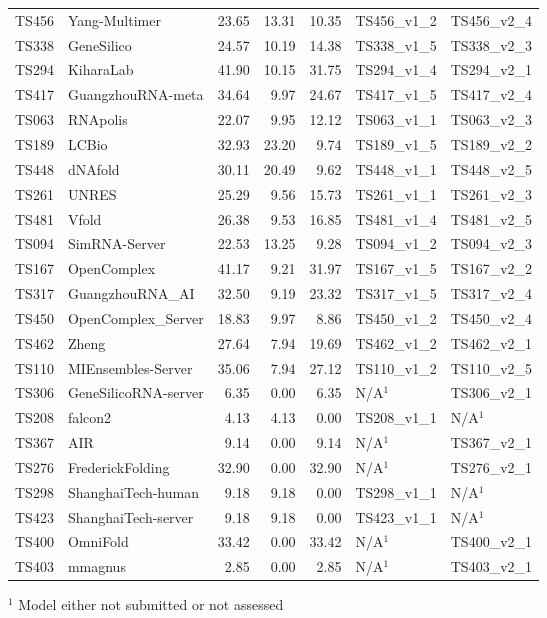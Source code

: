 \begin{table}[ht]
{\begin{tabular}{llrrrll}
TS456 & Yang-Multimer & 23.65 & 13.31 & 10.35 & TS456\_v1\_2 & TS456\_v2\_4 \\ 
TS338 & GeneSilico & 24.57 & 10.19 & 14.38 & TS338\_v1\_5 & TS338\_v2\_3 \\ 
TS294 & KiharaLab & 41.90 & 10.15 & 31.75 & TS294\_v1\_4 & TS294\_v2\_1 \\ 
TS417 & GuangzhouRNA-meta & 34.64 & 9.97 & 24.67 & TS417\_v1\_5 & TS417\_v2\_4 \\ 
TS063 & RNApolis & 22.07 & 9.95 & 12.12 & TS063\_v1\_1 & TS063\_v2\_3 \\ 
TS189 & LCBio & 32.93 & 23.20 & 9.74 & TS189\_v1\_5 & TS189\_v2\_2 \\ 
TS448 & dNAfold & 30.11 & 20.49 & 9.62 & TS448\_v1\_1 & TS448\_v2\_5 \\ 
TS261 & UNRES & 25.29 & 9.56 & 15.73 & TS261\_v1\_1 & TS261\_v2\_3 \\ 
TS481 & Vfold & 26.38 & 9.53 & 16.85 & TS481\_v1\_4 & TS481\_v2\_5 \\ 
TS094 & SimRNA-Server & 22.53 & 13.25 & 9.28 & TS094\_v1\_2 & TS094\_v2\_3 \\ 
TS167 & OpenComplex & 41.17 & 9.21 & 31.97 & TS167\_v1\_5 & TS167\_v2\_2 \\ 
TS317 & GuangzhouRNA\_AI & 32.50 & 9.19 & 23.32 & TS317\_v1\_5 & TS317\_v2\_4 \\ 
TS450 & OpenComplex\_Server & 18.83 & 9.97 & 8.86 & TS450\_v1\_2 & TS450\_v2\_4 \\ 
TS462 & Zheng & 27.64 & 7.94 & 19.69 & TS462\_v1\_2 & TS462\_v2\_1 \\ 
TS110 & MIEnsembles-Server & 35.06 & 7.94 & 27.12 & TS110\_v1\_2 & TS110\_v2\_5 \\ 
TS306 & GeneSilicoRNA-server & 6.35 & 0.00 & 6.35 & N/A$^{1}$ & TS306\_v2\_1 \\ 
TS208 & falcon2 & 4.13 & 4.13 & 0.00 & TS208\_v1\_1 & N/A$^{1}$ \\ 
TS367 & AIR & 9.14 & 0.00 & 9.14 & N/A$^{1}$ & TS367\_v2\_1 \\ 
TS276 & FrederickFolding & 32.90 & 0.00 & 32.90 & N/A$^{1}$ & TS276\_v2\_1 \\ 
TS298 & ShanghaiTech-human & 9.18 & 9.18 & 0.00 & TS298\_v1\_1 & N/A$^{1}$ \\ 
TS423 & ShanghaiTech-server & 9.18 & 9.18 & 0.00 & TS423\_v1\_1 & N/A$^{1}$ \\ 
TS400 & OmniFold & 33.42 & 0.00 & 33.42 & N/A$^{1}$ & TS400\_v2\_1 \\ 
TS403 & mmagnus & 2.85 & 0.00 & 2.85 & N/A$^{1}$ & TS403\_v2\_1 \\ 
\bottomrule
\end{tabular}%
}
\begin{flushleft}\footnotesize $^{1}$ Model either not submitted or not assessed\end{flushleft}
\end{table}
